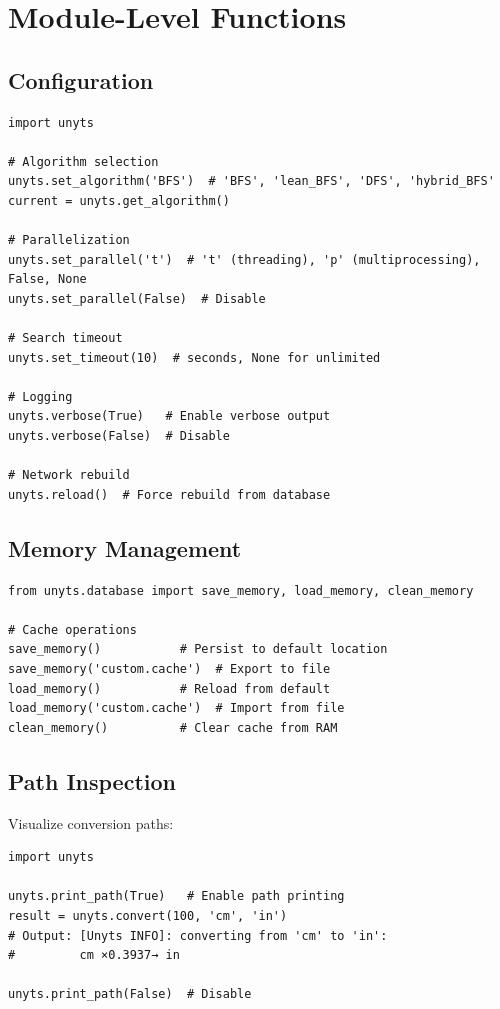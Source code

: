 \documentclass[11pt,a4paper]{report}
\begin{document}
\section{Module-Level Functions}

\subsection{Configuration}

\begin{lstlisting}[style=pythonstyle]
import unyts

# Algorithm selection
unyts.set_algorithm('BFS')  # 'BFS', 'lean_BFS', 'DFS', 'hybrid_BFS'
current = unyts.get_algorithm()

# Parallelization
unyts.set_parallel('t')  # 't' (threading), 'p' (multiprocessing), False, None
unyts.set_parallel(False)  # Disable

# Search timeout
unyts.set_timeout(10)  # seconds, None for unlimited

# Logging
unyts.verbose(True)   # Enable verbose output
unyts.verbose(False)  # Disable

# Network rebuild
unyts.reload()  # Force rebuild from database
\end{lstlisting}

\subsection{Memory Management}

\begin{lstlisting}[style=pythonstyle]
from unyts.database import save_memory, load_memory, clean_memory

# Cache operations
save_memory()           # Persist to default location
save_memory('custom.cache')  # Export to file
load_memory()           # Reload from default
load_memory('custom.cache')  # Import from file
clean_memory()          # Clear cache from RAM
\end{lstlisting}

\subsection{Path Inspection}

Visualize conversion paths:

\begin{lstlisting}[style=pythonstyle]
import unyts

unyts.print_path(True)   # Enable path printing
result = unyts.convert(100, 'cm', 'in')
# Output: [Unyts INFO]: converting from 'cm' to 'in': 
#         cm ×0.3937→ in

unyts.print_path(False)  # Disable
\end{lstlisting}
\end{document}
